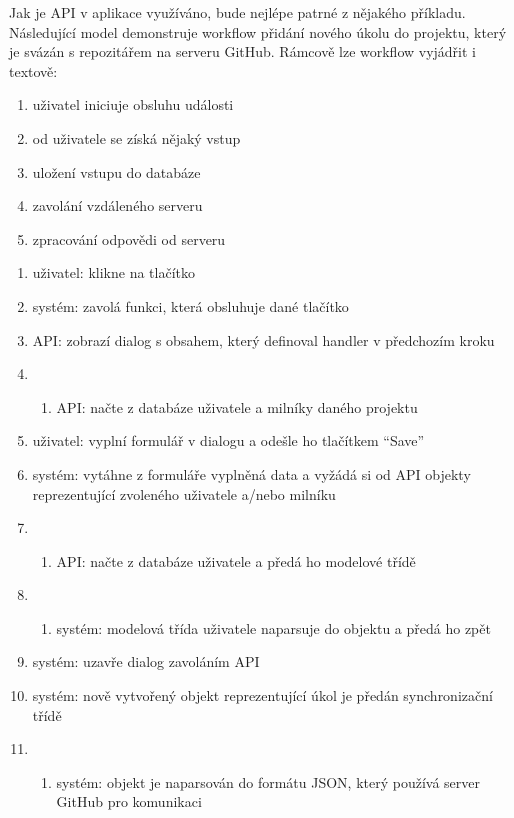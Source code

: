 Jak je API v aplikace využíváno, bude nejlépe patrné z nějakého příkladu. Následující model demonstruje workflow přidání nového úkolu do projektu, který je svázán s repozitářem na serveru GitHub. Rámcově lze workflow vyjádřit i textově:

\begin{enumerate}
\item uživatel iniciuje obsluhu události
\item od uživatele se získá nějaký vstup
\item uložení vstupu do databáze
\item zavolání vzdáleného serveru
\item zpracování odpovědi od serveru
\end{enumerate}

\begin{enumerate}
\item uživatel: klikne na tlačítko 
\item systém: zavolá funkci, která obsluhuje dané tlačítko
\item API: zobrazí dialog s obsahem, který definoval handler v předchozím kroku
\item \begin{enumerate}
\item API: načte z databáze uživatele a milníky daného projektu
\end{enumerate}
\item uživatel: vyplní formulář v dialogu a odešle ho tlačítkem ``Save''
\item systém: vytáhne z formuláře vyplněná data a vyžádá si od API objekty reprezentující zvoleného uživatele a\slash nebo milníku
\item \begin{enumerate}
\item API: načte z databáze uživatele a předá ho modelové třídě
\end{enumerate}
\item \begin{enumerate}
\item systém: modelová třída uživatele naparsuje do objektu a předá ho zpět
\end{enumerate}
\item systém: uzavře dialog zavoláním API
\item systém: nově vytvořený objekt reprezentující úkol je předán synchronizační třídě
\item \begin{enumerate}
\item systém: objekt je naparsován do formátu JSON, který používá server GitHub pro komunikaci

\end{enumerate}
\end{enumerate}
